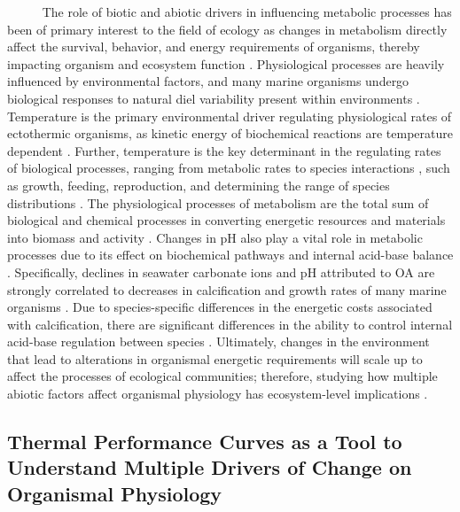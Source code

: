 \documentclass[
  12pt,
]{article}
\begin{document}
~~~~~ The role of biotic and abiotic drivers in influencing metabolic
processes has been of primary interest to the field of ecology as
changes in metabolism directly affect the survival, behavior, and energy
requirements of organisms, thereby impacting organism and ecosystem
function \citep{carey2016sea}. Physiological processes are heavily
influenced by environmental factors, and many marine organisms undergo
biological responses to natural diel variability present within
environments \citep{hofmann2010living}. Temperature is the primary
environmental driver regulating physiological rates of ectothermic
organisms, as kinetic energy of biochemical reactions are temperature
dependent
\citep{levins1968evolution, huey1979integrating, hochachka2002biochemical}.
Further, temperature is the key determinant in the regulating rates of
biological processes, ranging from metabolic rates
\citep{gillooly2001effects} to species interactions
\citep{sanford1999regulation}, such as growth, feeding, reproduction,
and determining the range of species distributions
\citep{kordas2011community, sanford2002feeding, pinsky2013marine}. The
physiological processes of metabolism are the total sum of biological
and chemical processes in converting energetic resources and materials
into biomass and activity \citep{brown2004metabolic}. Changes in pH also
play a vital role in metabolic processes due to its effect on
biochemical pathways and internal acid-base balance
\citep{gaylord2015ocean}. Specifically, declines in seawater carbonate
ions and pH attributed to OA are strongly correlated to decreases in
calcification and growth rates of many marine organisms
\citep{kroeker2013impacts}. Due to species-specific differences in the
energetic costs associated with calcification, there are significant
differences in the ability to control internal acid-base regulation
between species \citep{doney2009ocean}. Ultimately, changes in the
environment that lead to alterations in organismal energetic
requirements will scale up to affect the processes of ecological
communities; therefore, studying how multiple abiotic factors affect
organismal physiology has ecosystem-level implications
\citep{tomanek2002heat, barclay2019variation, kroeker2022ecological}.

\newpage

\hypertarget{thermal-performance-curves-as-a-tool-to-understand-multiple-drivers-of-change-on-organismal-physiology}{%
\subsection{Thermal Performance Curves as a Tool to Understand Multiple
Drivers of Change on Organismal
Physiology}\label{thermal-performance-curves-as-a-tool-to-understand-multiple-drivers-of-change-on-organismal-physiology}}
\end{document}
